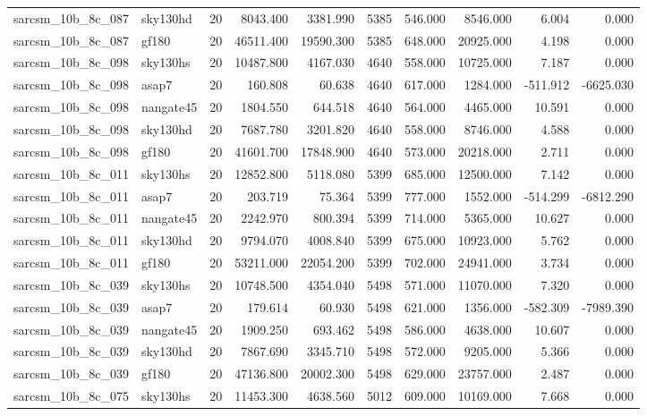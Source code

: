 \begin{longtable}{llrrrrrrrr}
sarcsm\_10b\_8c\_087 & sky130hd & 20 & 8043.400 & 3381.990 & 5385 & 546.000 & 8546.000 & 6.004 & 0.000 \\
sarcsm\_10b\_8c\_087 & gf180 & 20 & 46511.400 & 19590.300 & 5385 & 648.000 & 20925.000 & 4.198 & 0.000 \\
sarcsm\_10b\_8c\_098 & sky130hs & 20 & 10487.800 & 4167.030 & 4640 & 558.000 & 10725.000 & 7.187 & 0.000 \\
sarcsm\_10b\_8c\_098 & asap7 & 20 & 160.808 & 60.638 & 4640 & 617.000 & 1284.000 & -511.912 & -6625.030 \\
sarcsm\_10b\_8c\_098 & nangate45 & 20 & 1804.550 & 644.518 & 4640 & 564.000 & 4465.000 & 10.591 & 0.000 \\
sarcsm\_10b\_8c\_098 & sky130hd & 20 & 7687.780 & 3201.820 & 4640 & 558.000 & 8746.000 & 4.588 & 0.000 \\
sarcsm\_10b\_8c\_098 & gf180 & 20 & 41601.700 & 17848.900 & 4640 & 573.000 & 20218.000 & 2.711 & 0.000 \\
sarcsm\_10b\_8c\_011 & sky130hs & 20 & 12852.800 & 5118.080 & 5399 & 685.000 & 12500.000 & 7.142 & 0.000 \\
sarcsm\_10b\_8c\_011 & asap7 & 20 & 203.719 & 75.364 & 5399 & 777.000 & 1552.000 & -514.299 & -6812.290 \\
sarcsm\_10b\_8c\_011 & nangate45 & 20 & 2242.970 & 800.394 & 5399 & 714.000 & 5365.000 & 10.627 & 0.000 \\
sarcsm\_10b\_8c\_011 & sky130hd & 20 & 9794.070 & 4008.840 & 5399 & 675.000 & 10923.000 & 5.762 & 0.000 \\
sarcsm\_10b\_8c\_011 & gf180 & 20 & 53211.000 & 22054.200 & 5399 & 702.000 & 24941.000 & 3.734 & 0.000 \\
sarcsm\_10b\_8c\_039 & sky130hs & 20 & 10748.500 & 4354.040 & 5498 & 571.000 & 11070.000 & 7.320 & 0.000 \\
sarcsm\_10b\_8c\_039 & asap7 & 20 & 179.614 & 60.930 & 5498 & 621.000 & 1356.000 & -582.309 & -7989.390 \\
sarcsm\_10b\_8c\_039 & nangate45 & 20 & 1909.250 & 693.462 & 5498 & 586.000 & 4638.000 & 10.607 & 0.000 \\
sarcsm\_10b\_8c\_039 & sky130hd & 20 & 7867.690 & 3345.710 & 5498 & 572.000 & 9205.000 & 5.366 & 0.000 \\
sarcsm\_10b\_8c\_039 & gf180 & 20 & 47136.800 & 20002.300 & 5498 & 629.000 & 23757.000 & 2.487 & 0.000 \\
sarcsm\_10b\_8c\_075 & sky130hs & 20 & 11453.300 & 4638.560 & 5012 & 609.000 & 10169.000 & 7.668 & 0.000 \\

\end{longtable}
